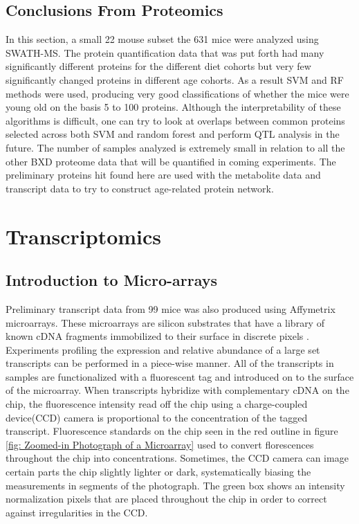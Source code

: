 \documentclass[a4paper,11pt,twoside]{book}
\begin{document}
	
	\section{Conclusions From Proteomics}
	
    In this section, a small 22 mouse subset the 631 mice were analyzed using SWATH-MS. The protein quantification data that was put forth had many significantly different proteins for the different diet cohorts but very few significantly changed proteins in different age cohorts. As a result SVM and RF methods were used, producing very good classifications of whether the mice were young old on the basis 5 to 100 proteins. Although the interpretability of these algorithms is difficult, one can try to look at overlaps between common proteins selected across both SVM and random forest and perform QTL analysis in the future. The number of samples analyzed is extremely small in relation to all the other BXD proteome data that will be quantified in coming experiments. The preliminary proteins hit found here are used with the metabolite data and transcript data to try to construct age-related protein network.
	
	\chapter{Transcriptomics}
	
	\section{Introduction to Micro-arrays}
	
    Preliminary transcript data from 99 mice was also produced using Affymetrix microarrays. These microarrays are silicon substrates that have a library of known cDNA fragments immobilized to their surface in discrete pixels \citep{Miller2009MicroArrays}.  Experiments profiling the expression and relative abundance of a large set transcripts can be performed in a piece-wise manner. All of the transcripts in samples are functionalized with a fluorescent tag and introduced on to the surface of the microarray. When transcripts hybridize with complementary cDNA on the chip, the fluorescence intensity read off the chip using a charge-coupled device(CCD) camera is proportional to the concentration of the tagged transcript. Fluorescence standards on the chip seen in the red outline in figure \ref{fig: Zoomed-in Photograph of a Microarray} used to convert florescences throughout the chip into concentrations. Sometimes, the CCD camera can image certain parts the chip slightly lighter or dark, systematically biasing the measurements in segments of the photograph. The green box shows an intensity normalization pixels that are placed throughout the chip in order to correct against irregularities in the CCD.
	
\end{document}
